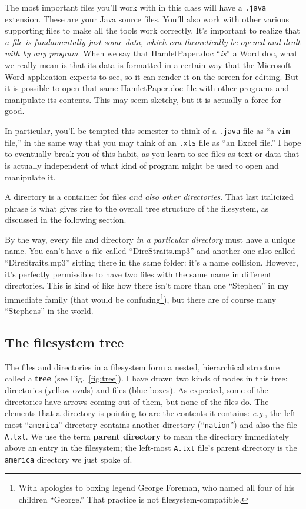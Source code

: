 The most important files you'll work with in this class will have a
\texttt{.java} extension. These are your Java source files. You'll also work
with other various supporting files to make all the tools work correctly.
It's important to realize that \textit{a file is fundamentally just some data,
which can theoretically be opened and dealt with by any program}. When we say
that HamletPaper.doc ``\textit{is}'' a Word doc, what we really mean is that
its data is formatted in a certain way that the Microsoft Word application
expects to see, so it can render it on the screen for editing. But it is
possible to open that same HamletPaper.doc file with other programs and
manipulate its contents. This may seem sketchy, but it is actually a force for
good.

In particular, you'll be tempted this semester to think of a \texttt{.java}
file as ``a \texttt{vim} file,'' in the same way that you may think of an
\texttt{.xls} file as ``an Excel file.'' I hope to eventually break you of this
habit, as you learn to see files as text or data that is actually independent
of what kind of program might be used to open and manipulate it.

A directory is a container for files \textit{and also other directories}. That
last italicized phrase is what gives rise to the overall tree structure of the
filesystem, as discussed in the following section.

By the way, every file and directory \textit{in a particular directory} must
have a unique name. You can't have a file called ``DireStraits.mp3'' and
another one also called ``DireStraits.mp3'' sitting there in the same folder:
it's a name collision. However, it's perfectly permissible to have two files
with the same name in different directories. This is kind of like how there
isn't more than one ``Stephen'' in my immediate family (that would be
confusing\footnote{With apologies to boxing legend George Foreman, who named
all four of his children ``George.'' That practice is not
filesystem-compatible.}), but there are of course many ``Stephens'' in the
world.

\subsection{The filesystem tree}

The files and directories in a filesystem form a nested, hierarchical
structure called a \textbf{tree} (see Fig.~\ref{fig:tree}). I have drawn two
kinds of nodes in this tree: directories (yellow ovals) and files (blue
boxes). As expected, some of the directories have arrows coming out of them,
but none of the files do. The elements that a directory is pointing to are the
contents it contains: \textit{e.g.}, the left-most ``\texttt{america}''
directory contains another directory (``\texttt{nation}'') and also the file
\texttt{A.txt}. We use the term \textbf{parent directory} to mean the
directory immediately above an entry in the filesystem; the left-most
\texttt{A.txt} file's parent directory is the \texttt{america} directory we
just spoke of.

